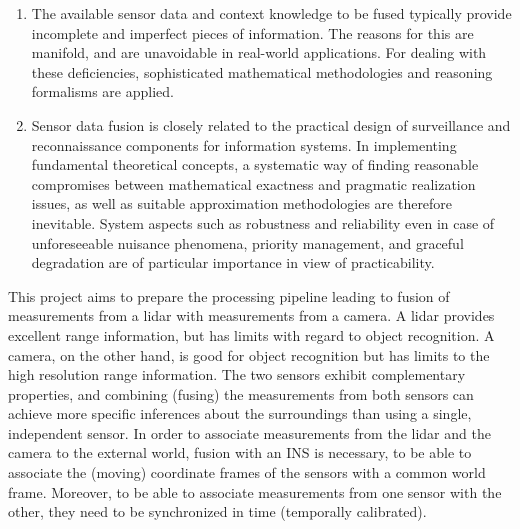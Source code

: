 \begin{enumerate}
    \item The available sensor data and context knowledge to be fused typically provide incomplete and imperfect pieces of information. The reasons for this are manifold, and are unavoidable in real-world applications. For dealing with these deficiencies, sophisticated mathematical methodologies and reasoning formalisms are applied.
    \item Sensor data fusion is closely related to the practical design of surveillance and reconnaissance components for information systems. In implementing fundamental theoretical concepts, a systematic way of finding reasonable compromises between mathematical exactness and pragmatic realization issues, as well as suitable approximation methodologies are therefore inevitable. System aspects such as robustness and reliability even in case of unforeseeable nuisance phenomena, priority management, and graceful degradation are of particular importance in view of practicability.
\end{enumerate}This project aims to prepare the processing pipeline leading to fusion of measurements from a lidar with measurements from a camera. A lidar provides excellent range information, but has limits with regard to object recognition. A camera, on the other hand, is good for object recognition but has limits to the high resolution range information. The two sensors exhibit complementary properties, and combining (fusing) the measurements from both sensors can achieve more specific inferences about the surroundings than using a single, independent sensor. In order to associate measurements from the lidar and the camera to the external world, fusion with an INS is necessary, to be able to associate the (moving) coordinate frames of the sensors with a common world frame. Moreover, to be able to associate measurements from one sensor with the other, they need to be synchronized in time (temporally calibrated).
